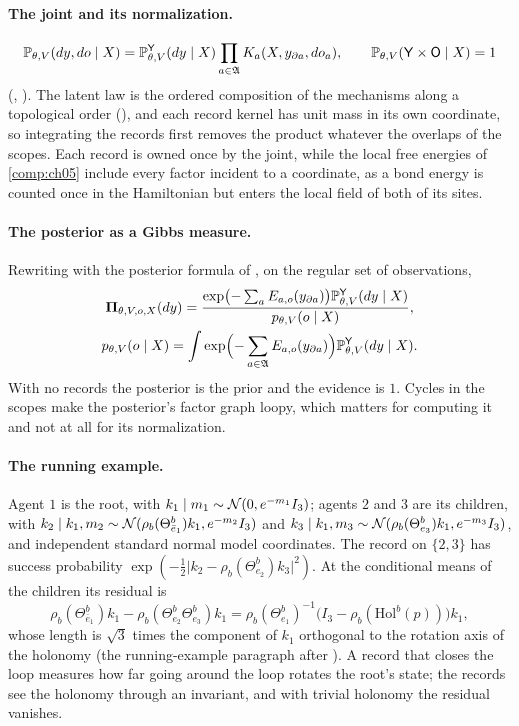\paragraph{The joint and its normalization.}
\[
\mathbb P_{\theta,V}(dy,do\mid X)
=\mathbb P_{\theta,V}^{\mathsf Y}(dy\mid X)\prod_{a\in\mathfrak A}K_a(X,y_{\partial a},do_a),
\qquad
\mathbb P_{\theta,V}(\mathsf Y\times\mathsf O\mid X)=1
\]
(, ). The latent law is the ordered composition of the
mechanisms along a topological order (), and each record kernel has unit mass in its own
coordinate, so integrating the records first removes the product whatever the overlaps of the scopes. Each record
is owned once by the joint, while the local free energies of \cref{comp:ch05} include every factor incident to a
coordinate, as a bond energy is counted once in the Hamiltonian but enters the local field of both of its sites.

\paragraph{The posterior as a Gibbs measure.}
Rewriting  with the posterior formula of ,
on the regular set of observations,
\begin{gather*}
\boldsymbol\Pi_{\theta,V,o,X}(dy)
=\frac{\exp\bigl(-\sum_{a}E_{a,o}(y_{\partial a})\bigr)\mathbb P^{\mathsf Y}_{\theta,V}(dy\mid X)}{p_{\theta,V}(o\mid X)},\\
p_{\theta,V}(o\mid X)=\int\exp\Bigl(-\sum_{a\in\mathfrak A}E_{a,o}(y_{\partial a})\Bigr)\mathbb P^{\mathsf Y}_{\theta,V}(dy\mid X).
\end{gather*}
With no records the posterior is the prior and the evidence is $1$. Cycles in the scopes make the posterior's
factor graph loopy, which matters for computing it and not at all for its normalization.

\paragraph{The running example.}
Agent $1$ is the root, with $k_1\mid m_1\sim\mathcal N(0,e^{-m_1}I_3)$; agents $2$ and $3$ are its children, with
$k_2\mid k_1,m_2\sim\mathcal N(\rho_b(\Theta^b_{\bar e_1})k_1,e^{-m_2}I_3)$ and
$k_3\mid k_1,m_3\sim\mathcal N(\rho_b(\Theta^b_{e_3})k_1,e^{-m_3}I_3)$, and independent standard normal model
coordinates. The record on $\{2,3\}$ has success probability $\exp(-\tfrac12\lvert k_2-\rho_b(\Theta^b_{e_2})k_3\rvert^2)$.
At the conditional means of the children its residual is
\[
\rho_b(\Theta^b_{\bar e_1})k_1-\rho_b(\Theta^b_{e_2}\Theta^b_{e_3})k_1
=\rho_b(\Theta^b_{e_1})^{-1}\bigl(I_3-\rho_b(\mathrm{Hol}^b(p))\bigr)k_1,
\]
whose length is $\sqrt3$ times the component of $k_1$ orthogonal to the rotation axis of the holonomy (the
running-example paragraph after ). A record that closes the loop measures how far
going around the loop rotates the root's state; the records see the holonomy through an invariant, and with
trivial holonomy the residual vanishes.

